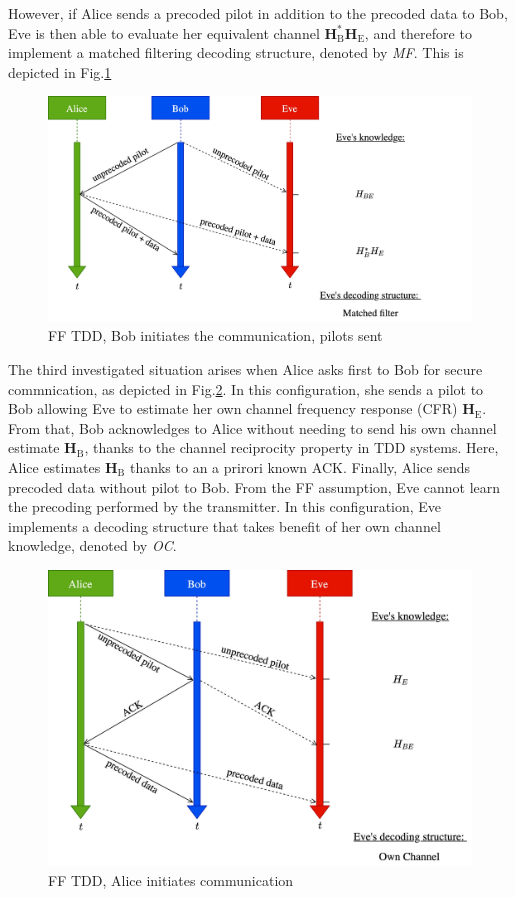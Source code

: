 \documentclass[12pt, draftclsnofoot, onecolumn]{IEEEtran}
\let\MYoriglatexcaption\caption
\renewcommand{\caption}[2][\relax]{\MYoriglatexcaption[#2]{#2}}
\newcommand{\HE}{\textbf{H}_{\text{E}}}
\newcommand{\HB}{\textbf{H}_{\text{B}}}
\begin{document}
However, if Alice sends a precoded pilot in addition to the  precoded data to Bob, Eve is then able to evaluate her equivalent channel $\HB^*\HE$, and therefore to implement a matched filtering decoding structure, denoted by \textit{MF}. This is depicted in Fig.\ref{fig_ff_tdd_b_pilot}
\begin{figure}[!htb]
	\centering
	\includegraphics[width=.75\linewidth]{graphs/diagram_sequence-FF_TDD_B_pilot.jpg}
	\caption{FF TDD, Bob initiates the communication, pilots sent}
	\label{fig_ff_tdd_b_pilot}
\end{figure}

The third investigated situation arises when Alice asks first to Bob for secure commnication, as depicted in Fig.\ref{fig_ff_tdd_a}. In this configuration, she sends a pilot to Bob allowing Eve to estimate her own channel frequency response (CFR) $\HE$. From that, Bob acknowledges to Alice without needing to send his own channel estimate $\HB$, thanks to the channel reciprocity property in TDD systems. Here, Alice estimates $\HB$ thanks to an a prirori known ACK. Finally, Alice sends precoded data without pilot to Bob. From the FF assumption, Eve cannot learn the precoding performed by the transmitter. In this configuration, Eve implements  a decoding structure that takes benefit of her own channel knowledge, denoted by \textit{OC}. 
\begin{figure}[!htb]
	\centering
	\includegraphics[width=.65\linewidth]{graphs/diagram_sequence-FF_TDD_A.jpg}
	\caption{FF TDD, Alice initiates communication}
	\label{fig_ff_tdd_a}
\end{figure}
\end{document}
